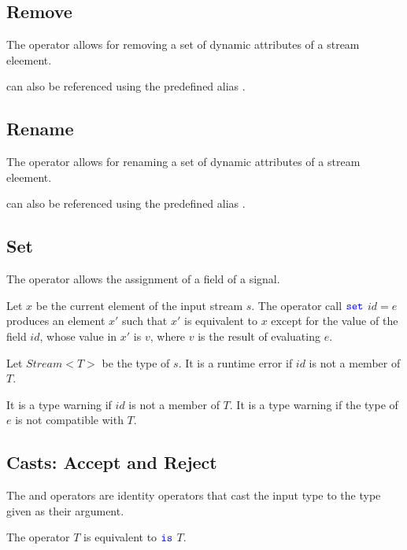 \documentclass{article}
\begin{document}
\subsection{Remove}
\label{remove}

The \REMOVE{} operator allows for removing a set of dynamic attributes of a stream eleement.

\REMOVE{} can also be referenced using the predefined alias \PROJECTREMOVE.

\subsection{Rename}
\label{rename}


The \RENAME{} operator allows for renaming a set of dynamic attributes of a stream eleement.

\RENAME{} can also be referenced using the predefined alias \PROJECTRENAME.

\subsection{Set}
\label{set}

The \SET{} operator allows the assignment of a field of a signal.

Let $x$ be the current element of the input stream $s$. The operator call $\texttt{\color{blue} set}$ $ id = e$ produces an element $x'$ such that $x'$ is equivalent to $x$ except for the value of the field $id$, whose value in $x'$ is $v$, where $v$ is the result of evaluating $e$.

Let $Stream \lt T \gt$ be the type of $s$.  It is a runtime error if $id$ is not a member of  $T$.


It is a type warning if $id$ is not a member of  $T$. It is a type warning if the type of $e$ is not compatible with $T$.

\subsection{Casts: Accept and Reject}
\label{casts}

The \ACCEPT{} and \REJECT{} operators are identity operators that cast the input type to the type given as their argument.

The operator \ACCEPT{} $T$ is equivalent to \WHERE{} $\texttt{\color{blue} is}{}$ $T$.
\end{document}
